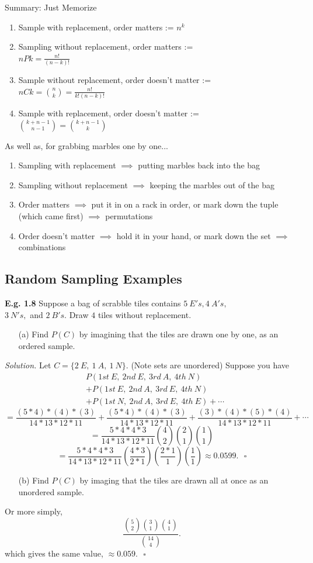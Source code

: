 \documentclass[12pt]{book}
\begin{document}
Summary: Just Memorize
\begin{enumerate}
\item Sample with replacement, order matters := $n^k$
\item Sampling without replacement, order matters := \\$nPk = \frac{n!}{(n-k)!}$
\item Sample without replacement, order doesn't matter := $nCk = {n \choose k} = \frac{n!}{k!(n-k)!}$
\item Sample with replacement, order doesn't matter := \\${k+n-1 \choose n-1}={k+n-1 \choose k}$ 
\end{enumerate}
As well as, for grabbing marbles one by one...
\begin{enumerate}
\item Sampling with replacement $\implies{}$ putting marbles back into the bag
\item Sampling without replacement $\implies{}$ keeping the marbles out of the bag
\item Order matters $\implies{}$ put it in on a rack in order, or mark down the tuple (which came first) $\implies{}$ permutations
\item Order doesn't matter $\implies{}$ hold it in your hand, or mark down the set $\implies{}$ combinations
\end{enumerate}

\subsection{Random Sampling Examples}

\textbf{E.g. 1.8} Suppose a bag of scrabble tiles contains $5~E's,4~A's,$ \\$3~N's,$ and $2~B's$. Draw $4$ tiles without replacement.
\begin{itemize} \item[(a)] Find $P(C)$ by imagining that the tiles are drawn one by one, as an ordered sample.\end{itemize}
\textit{Solution.}
Let $C = \{ 2~E,~1~A,~1~N \}$. (Note sets are unordered)
Suppose you have
\begin{align*}
&P(1st~E,~2nd~E,~3rd~A,~4th~N)\\
&+ P(1st~E,~2nd~A,~3rd~E,~4th~N)\\
&+ P(1st~N,~2nd~A,~3rd~E,~4th~E) + \cdots
\end{align*}
$$ = \frac{(5*4)*(4)*(3)}{14*13*12*11} + \frac{(5*4)*(4)*(3)}{14*13*12*11} + \frac{(3)*(4)*(5)*(4)}{14*13*12*11}+\cdots$$
$$=\frac{5*4*4*3}{14*13*12*11} {4 \choose 2}{2\choose 1}{1\choose 1}$$
$$=\frac{5*4*4*3}{14*13*12*11} \left( \frac{4*3}{2*1} \right) \left( \frac{2*1}{1} \right) \left(\frac{1}{1}\right) \approx 0.0599. ~~~\square$$
\begin{itemize}\item[(b)] Find $P(C)$ by imaging that the tiles are drawn all at once as an unordered sample.\end{itemize}
Or more simply,
$$\frac{ {5\choose 2}{3\choose 1}{4\choose 1}  }{{14\choose 4}}.$$
which gives the same value, $\approx 0.059$.$~~~\square$\\
\end{document}
